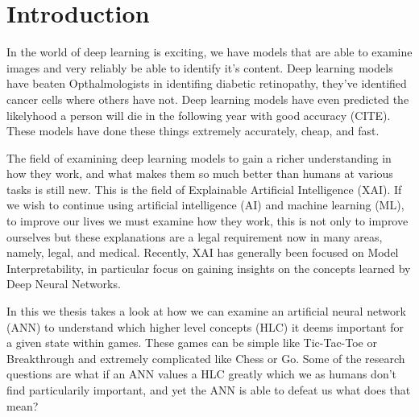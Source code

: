 \chapter{Introduction\label{cha:introduction}}

In the world of deep learning is exciting, we have models that are able to examine
images and very reliably be able to identify it's content. Deep learning models have
beaten Opthalmologists in identifing diabetic retinopathy, they've identified
cancer cells where others have not. Deep learning models have even predicted
the likelyhood a person will die in the following year with good accuracy (CITE).
These models have done these things extremely accurately, cheap, and fast.

The field of examining deep learning models to gain a richer understanding
in how they work, and what makes them so much better than humans at various tasks
is still new. This is the field of Explainable Artificial Intelligence (XAI).
If we wish to continue using artificial intelligence (AI) and machine learning (ML),
to improve our lives we must examine how they work, this is not only to improve
ourselves but these explanations are a legal requirement now in many areas, namely, legal, and
medical. Recently, XAI has generally been focused on Model Interpretability, in
particular focus on gaining insights on the concepts learned by Deep Neural Networks.

In this we thesis takes a look at how we can examine an artificial neural network (ANN)
to understand which higher level concepts (HLC) it deems important for a given state
within games. These games can be simple like Tic-Tac-Toe or Breakthrough and extremely
complicated like Chess or Go. Some of the research questions are what if an ANN values a HLC greatly
which we as humans don't find particularily important, and yet the ANN is able to defeat
us what does that mean?

